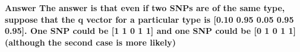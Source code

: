 \documentclass[10pt]{article}
\newcommand{\BF}{{\text{BF}}} %
\newcommand{\der}{{\text{d}}} %
\newcommand{\Xv}{\mbox{\boldmath$X$}}
\begin{document}
\textbf{Answer
 The answer is that even if two SNPs are of the same type, suppose that the q vector for a particular type is [0.10 0.95 0.05 0.95 0.95]. One SNP could be [1 1 0 1 1] and one SNP could be [0 1 0 1 1] (although the second case is more likely)}

%
%
%
%
%
%
%
%
%
\end{document}
